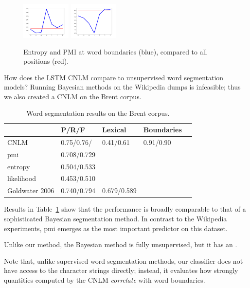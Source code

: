 \begin{figure}
\includegraphics[width=0.22\textwidth]{figures/segmentation-profile-flattened-entropies-german.png}
\includegraphics[width=0.22\textwidth]{figures/segmentation-profile-flattened-pmis-german.png}
	\caption{Entropy and PMI at word boundaries (blue), compared to all positions (red). }\label{fig:syntax-depth}
\end{figure}

How does the LSTM CNLM compare to unsupervised word segmentation models?
Running Bayesian methods on the Wikipedia dumps is infeasible; thus we also created a CNLM on the Brent corpus.

\begin{table}[t]
  \begin{center}
    \begin{tabular}{l|l|l|l|l}
      \multicolumn{1}{c}{}&P/R/F & Lexical & Boundaries\\      \hline
      CNLM & 0.75/0.76/ & 0.41/0.61 & 0.91/0.90 \\
     pmi & 0.708/0.729 \\
     entropy & 0.504/0.533 \\
     likelihood & 0.453/0.510 \\
      Goldwater 2006 & 0.740/0.794 & 0.679/0.589
    \end{tabular}
  \end{center}
  \caption{\label{tab:segmentation-results-brent} Word segmentation results on the Brent corpus.}
\end{table}

Results in Table~\ref{tab:segmentation-results-brent} show that the performance is broadly comparable to that of a sophisticated Bayesian segmentation method.
In contrast to the Wikipedia experiments, pmi emerges as the most important predictor on this dataset.

Unlike our method, the Bayesian method is fully unsupervised, but it has an .

Note that, unlike supervised word segmentation methods, our classifier does not have access to the character strings directly; instead, it evaluates how strongly quantities computed by the CNLM \emph{correlate} with word boundaries.




